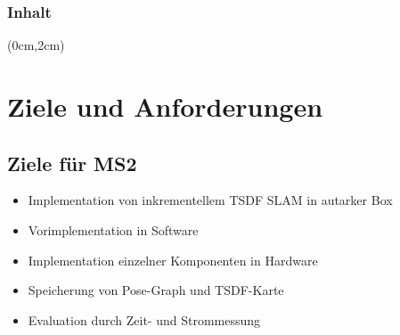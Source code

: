 \documentclass{beamer}
\begin{document}
{
\begin{frame}
\titlepage
\end{frame}}

\begin{frame}
\frametitle{Inhalt}
\tableofcontents
\begin{textblock*}{1cm}(0cm,2cm)
\end{textblock*}
\end{frame}



\section{Ziele und Anforderungen}
\begin{frame}{}
\begin{center}
\end{center}
\end{frame}

\subsection{Ziele für MS2}
\begin{frame}{\subsecname}
\begin{itemize}
\item Implementation von inkrementellem TSDF SLAM in \glqq{}autarker\grqq{} Box
\item Vorimplementation in Software
\item Implementation einzelner Komponenten in Hardware
\item Speicherung von Pose-Graph und TSDF-Karte
\item Evaluation durch Zeit- und Strommessung
\end{itemize}
\end{frame}
\end{document}
